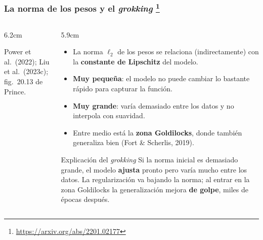 \documentclass[aspectratio=169, 10pt]{beamer}
\newcommand{\fuente}[1]{{\scriptsize\color{StanfordGray}#1}}
\begin{document}
\begin{frame}
\frametitle{La norma de los pesos y el \emph{grokking} \footnote{\url{https://arxiv.org/abs/2201.02177}}}
\footnotesize %
\begin{columns}[c]
\begin{column}{6.2cm}
\begin{center}
\end{center}
\vspace{-0.4em}
\fuente{Power et al.\ (2022); Liu et al.\ (2023c); fig.~20.13 de Prince.}
\end{column}
\begin{column}{5.9cm}
\begin{itemize}
	\item La norma $\ell_2$ de los pesos se relaciona (indirectamente) con la \textbf{constante de Lipschitz} del modelo.
	\item \textbf{Muy peque\~na}: el modelo no puede cambiar lo bastante r\'apido para capturar la funci\'on.
	\item \textbf{Muy grande}: var\'ia demasiado entre los datos y no interpola con suavidad.
	\item Entre medio est\'a la \textbf{zona Goldilocks}, donde tambi\'en generaliza bien (Fort \& Scherlis, 2019).
\end{itemize}
\vspace{0.3em}
\begin{exampleblock}{Explicación del \emph{grokking}}
\footnotesize
Si la norma inicial es demasiado grande, el modelo \textbf{ajusta} pronto pero var\'ia mucho entre los datos. La regularizaci\'on va bajando la norma; al entrar en la zona Goldilocks la generalizaci\'on mejora \textbf{de golpe}, miles de \'epocas despu\'es.
\end{exampleblock}
\end{column}
\end{columns}
\end{frame}
\end{document}
